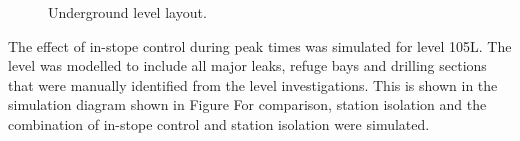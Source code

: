 	\begin{figure}[h!]
		\centering
		\caption{Underground level layout.}
		\label{fig: KUS Simulation level layout}
	\end{figure}	
	The effect of in-stope control during peak times was simulated for level 105L. The level was modelled to include all major leaks, refuge bays and drilling sections that were manually identified from the level investigations. This is shown in the simulation diagram shown in Figure For comparison, station isolation and the combination of in-stope control and station isolation were simulated. 
	

